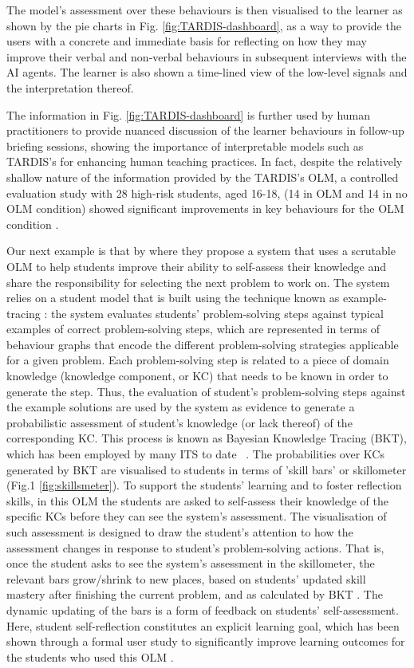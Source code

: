\documentclass{article}
\begin{document}
The model's assessment over these behaviours is then visualised to the learner as shown by the pie charts in Fig. \ref{fig:TARDIS-dashboard}, as a way to provide the users with a concrete and immediate basis for reflecting on how they may improve their verbal and non-verbal behaviours in subsequent interviews with the AI agents. The learner is also shown a time-lined view of the low-level signals and the interpretation thereof.

The information in Fig. \ref{fig:TARDIS-dashboard} is further used by human practitioners to provide nuanced discussion of the learner behaviours in follow-up briefing sessions, showing the importance of interpretable models such as TARDIS's for enhancing human teaching practices. In fact, despite the relatively shallow nature of the information provided by the TARDIS's OLM, a controlled evaluation study with 28 high-risk students, aged 16-18, (14 in OLM and 14 in no OLM condition) showed significant improvements in key behaviours for the OLM condition \cite{Porayska-Pomsta_2018}.

Our next example is that by \cite{LongAleven2017} where they propose a system that uses a scrutable OLM to help students improve their ability to self-assess their knowledge and share the responsibility for selecting the next problem to work on. The system relies on a student model that is built using the technique known as example-tracing \cite{aleven_example-tracing_2016}: the system evaluates students' problem-solving steps against typical examples of correct problem-solving steps, which are represented in terms of behaviour graphs that encode the different problem-solving strategies applicable for a given problem. Each problem-solving step is related to a piece of domain knowledge (knowledge component, or KC) that needs to be known in order to generate the step. Thus, the evaluation of student's problem-solving steps against the example solutions are used by the system as evidence to generate a probabilistic assessment of student's knowledge (or lack thereof) of the corresponding KC. This process is known as Bayesian Knowledge Tracing (BKT), which has been employed by many ITS to date ~\cite{aleven_knowledge_2013}. The probabilities over KCs generated by BKT are visualised to students in terms of 'skill bars' or skillometer (Fig.1 \ref{fig:skillsmeter}). To support the students' learning and to foster reflection skills, in this OLM the students are asked to self-assess their knowledge of the specific KCs before they can see the system's assessment. The visualisation of such assessment is designed to draw the student's attention to how the assessment changes in response to student's problem-solving actions. That is, once the student asks to see the system's assessment in the skillometer, the relevant bars grow/shrink to new places, based on students' updated skill mastery after finishing the current problem, and as calculated by BKT \cite{Koedinger_Corbett2006}. The dynamic updating of the bars is a form of feedback on students' self-assessment. Here, student self-reflection constitutes an explicit learning goal, which has been shown through a formal user study to significantly improve learning outcomes for the students who used this OLM \cite{LongAleven2017} . 
\end{document}
